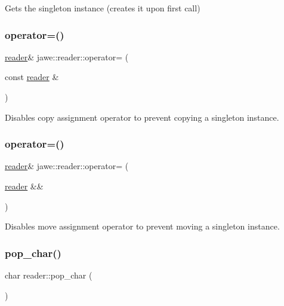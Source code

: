 Gets the singleton instance (creates it upon first call) \mbox{\label{classjawe_1_1reader_adbac83ebfd22fab33db3e172839228e4}} 
\subsubsection{\texorpdfstring{operator=()}{operator=()}\hspace{0.1cm}{\footnotesize\ttfamily [1/2]}}
{\footnotesize\ttfamily \hyperlink{classjawe_1_1reader}{reader}\& jawe\+::reader\+::operator= (\begin{DoxyParamCaption}\item[{const \hyperlink{classjawe_1_1reader}{reader} \&}]{ }\end{DoxyParamCaption})\hspace{0.3cm}{\ttfamily [delete]}}

Disables copy assignment operator to prevent copying a singleton instance. \mbox{\label{classjawe_1_1reader_a9d80f973208eed10e706a75974602acb}} 
\subsubsection{\texorpdfstring{operator=()}{operator=()}\hspace{0.1cm}{\footnotesize\ttfamily [2/2]}}
{\footnotesize\ttfamily \hyperlink{classjawe_1_1reader}{reader}\& jawe\+::reader\+::operator= (\begin{DoxyParamCaption}\item[{\hyperlink{classjawe_1_1reader}{reader} \&\&}]{ }\end{DoxyParamCaption})\hspace{0.3cm}{\ttfamily [delete]}}

Disables move assignment operator to prevent moving a singleton instance. \mbox{\label{classjawe_1_1reader_aae8ef7ace0047d2af3263485e9aeb436}} 
\subsubsection{\texorpdfstring{pop\+\_\+char()}{pop\_char()}}
{\footnotesize\ttfamily char reader\+::pop\+\_\+char (\begin{DoxyParamCaption}{ }\end{DoxyParamCaption})\hspace{0.3cm}{\ttfamily [private]}}

